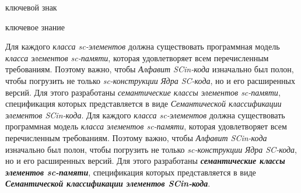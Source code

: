 \begin{SCn}
	
\begin{scnrelfromlist}{ключевой знак}
\end{scnrelfromlist}

\begin{scnrelfromlist}{ключевое знание}
\end{scnrelfromlist}	
	
\end{SCn}

Для каждого \textit{класса sc-элементов} должна существовать программная модель \textit{класса элементов sc-памяти\scnsupergroupsign}, которая удовлетворяет всем перечисленным требованиям. Поэтому важно, чтобы \textit{Алфавит SCin-кода\scnsupergroupsign} изначально был полон, чтобы погрузить не только \textit{sc-конструкции} \textit{Ядра SC-кода}, но и его расширенных версий. Для этого разработаны \textit{семантические классы элементов sc-памяти\scnsupergroupsign}, спецификация которых представляется в виде \textit{Семантической классификации элементов SCin-кода}.
Для каждого \textit{класса sc-элементов} должна существовать программная модель \textit{класса элементов sc-памяти\scnsupergroupsign}, которая удовлетворяет всем перечисленным требованиям. Поэтому важно, чтобы \textit{Алфавит SCin-кода} изначально был полон, чтобы погрузить не только \textit{sc-конструкции} \textit{Ядра SC-кода}, но и его расширенных версий. Для этого разработаны \textbf{\textit{семантические классы элементов sc-памяти\scnsupergroupsign}}, спецификация которых представляется в виде \textbf{\textit{Семантической классификации элементов SCin-кода}}.

